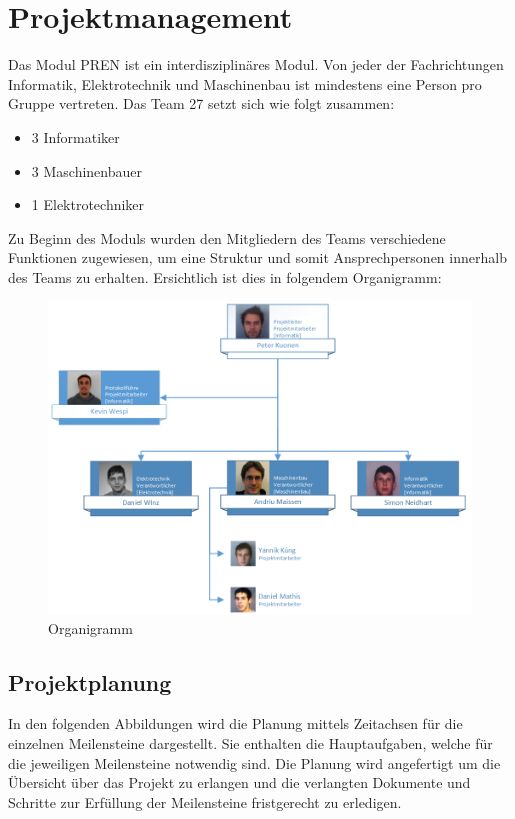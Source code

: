 \section{Projektmanagement}
Das Modul PREN ist ein interdisziplinäres Modul. Von jeder der Fachrichtungen 
Informatik, Elektrotechnik und Maschinenbau ist mindestens eine Person pro 
Gruppe vertreten. Das Team 27 setzt sich wie folgt zusammen:
\begin{itemize}
    \item 3 Informatiker
    \item 3 Maschinenbauer
    \item 1 Elektrotechniker
\end{itemize}
Zu Beginn des Moduls wurden den Mitgliedern des Teams verschiedene Funktionen 
zugewiesen, um eine Struktur und somit Ansprechpersonen innerhalb des Teams zu 
erhalten. Ersichtlich ist dies in folgendem Organigramm:
\begin{figure}[h!]
    \centering
    \includegraphics[width=1.0\textwidth]{fig/Organigramm.png}
    \caption{Organigramm}
    \label{fig:Organigramm}
\end{figure}

\subsection{Projektplanung}
In den folgenden Abbildungen wird die Planung mittels Zeitachsen für die 
einzelnen Meilensteine dargestellt. Sie enthalten die Hauptaufgaben, welche 
für die jeweiligen Meilensteine notwendig sind. Die Planung wird angefertigt 
um die Übersicht über das Projekt zu erlangen und die verlangten Dokumente und 
Schritte zur Erfüllung der Meilensteine fristgerecht zu erledigen.

